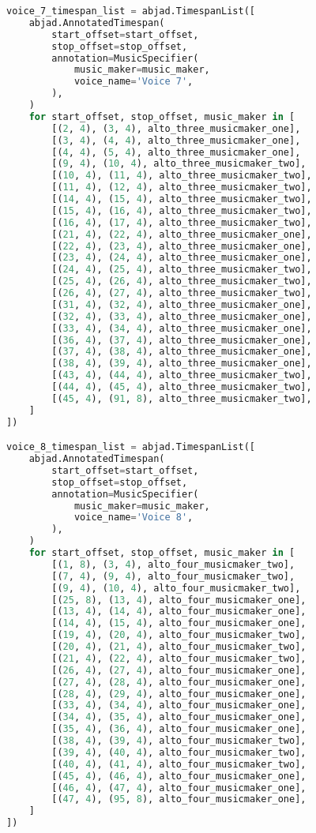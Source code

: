 \begin{lstlisting}[language=Python, caption=Invocation Source Code]
voice_7_timespan_list = abjad.TimespanList([
    abjad.AnnotatedTimespan(
        start_offset=start_offset,
        stop_offset=stop_offset,
        annotation=MusicSpecifier(
            music_maker=music_maker,
            voice_name='Voice 7',
        ),
    )
    for start_offset, stop_offset, music_maker in [
        [(2, 4), (3, 4), alto_three_musicmaker_one],
        [(3, 4), (4, 4), alto_three_musicmaker_one],
        [(4, 4), (5, 4), alto_three_musicmaker_one],
        [(9, 4), (10, 4), alto_three_musicmaker_two],
        [(10, 4), (11, 4), alto_three_musicmaker_two],
        [(11, 4), (12, 4), alto_three_musicmaker_two],
        [(14, 4), (15, 4), alto_three_musicmaker_two],
        [(15, 4), (16, 4), alto_three_musicmaker_two],
        [(16, 4), (17, 4), alto_three_musicmaker_two],
        [(21, 4), (22, 4), alto_three_musicmaker_one],
        [(22, 4), (23, 4), alto_three_musicmaker_one],
        [(23, 4), (24, 4), alto_three_musicmaker_one],
        [(24, 4), (25, 4), alto_three_musicmaker_two],
        [(25, 4), (26, 4), alto_three_musicmaker_two],
        [(26, 4), (27, 4), alto_three_musicmaker_two],
        [(31, 4), (32, 4), alto_three_musicmaker_one],
        [(32, 4), (33, 4), alto_three_musicmaker_one],
        [(33, 4), (34, 4), alto_three_musicmaker_one],
        [(36, 4), (37, 4), alto_three_musicmaker_one],
        [(37, 4), (38, 4), alto_three_musicmaker_one],
        [(38, 4), (39, 4), alto_three_musicmaker_one],
        [(43, 4), (44, 4), alto_three_musicmaker_two],
        [(44, 4), (45, 4), alto_three_musicmaker_two],
        [(45, 4), (91, 8), alto_three_musicmaker_two],
    ]
])

voice_8_timespan_list = abjad.TimespanList([
    abjad.AnnotatedTimespan(
        start_offset=start_offset,
        stop_offset=stop_offset,
        annotation=MusicSpecifier(
            music_maker=music_maker,
            voice_name='Voice 8',
        ),
    )
    for start_offset, stop_offset, music_maker in [
        [(1, 8), (3, 4), alto_four_musicmaker_two],
        [(7, 4), (9, 4), alto_four_musicmaker_two],
        [(9, 4), (10, 4), alto_four_musicmaker_two],
        [(25, 8), (13, 4), alto_four_musicmaker_one],
        [(13, 4), (14, 4), alto_four_musicmaker_one],
        [(14, 4), (15, 4), alto_four_musicmaker_one],
        [(19, 4), (20, 4), alto_four_musicmaker_two],
        [(20, 4), (21, 4), alto_four_musicmaker_two],
        [(21, 4), (22, 4), alto_four_musicmaker_two],
        [(26, 4), (27, 4), alto_four_musicmaker_one],
        [(27, 4), (28, 4), alto_four_musicmaker_one],
        [(28, 4), (29, 4), alto_four_musicmaker_one],
        [(33, 4), (34, 4), alto_four_musicmaker_one],
        [(34, 4), (35, 4), alto_four_musicmaker_one],
        [(35, 4), (36, 4), alto_four_musicmaker_one],
        [(38, 4), (39, 4), alto_four_musicmaker_two],
        [(39, 4), (40, 4), alto_four_musicmaker_two],
        [(40, 4), (41, 4), alto_four_musicmaker_two],
        [(45, 4), (46, 4), alto_four_musicmaker_one],
        [(46, 4), (47, 4), alto_four_musicmaker_one],
        [(47, 4), (95, 8), alto_four_musicmaker_one],
    ]
])


\end{lstlisting}
